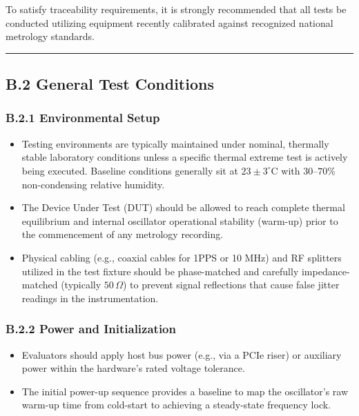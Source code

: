 \documentclass[
]{article}
\begin{document}
To satisfy traceability requirements, it is strongly recommended that
all tests be conducted utilizing equipment recently calibrated against
recognized national metrology standards.

\begin{center}\rule{0.5\linewidth}{0.5pt}\end{center}

\subsection{B.2 General Test
Conditions}\label{b.2-general-test-conditions}

\subsubsection{B.2.1 Environmental
Setup}\label{b.2.1-environmental-setup}

\begin{itemize}
\item
  Testing environments are typically maintained under nominal, thermally
  stable laboratory conditions unless a specific thermal extreme test is
  actively being executed. Baseline conditions generally sit at
  \(23 \pm 3 ^\circ\text{C}\) with \(30\text{--}70\%\) non-condensing
  relative humidity.
\item
  The Device Under Test (DUT) should be allowed to reach complete
  thermal equilibrium and internal oscillator operational stability
  (warm-up) prior to the commencement of any metrology recording.
\item
  Physical cabling (e.g., coaxial cables for 1PPS or 10 MHz) and RF
  splitters utilized in the test fixture should be phase-matched and
  carefully impedance-matched (typically \(50\,\Omega\)) to prevent
  signal reflections that cause false jitter readings in the
  instrumentation.
\end{itemize}

\subsubsection{B.2.2 Power and
Initialization}\label{b.2.2-power-and-initialization}

\begin{itemize}
\item
  Evaluators should apply host bus power (e.g., via a PCIe riser) or
  auxiliary power within the hardware's rated voltage tolerance.
\item
  The initial power-up sequence provides a baseline to map the
  oscillator's raw warm-up time from cold-start to achieving a
  steady-state frequency lock.
\end{itemize}
\end{document}
